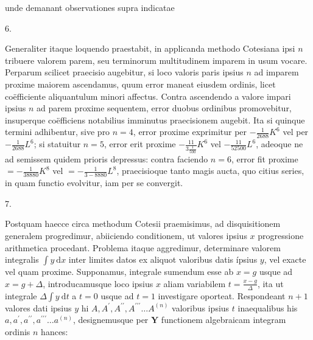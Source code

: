\documentclass[10pt]{article}
\begin{document}
unde demanant observationes supra indicatae

6.

Generaliter itaque loquendo praestabit, in applicanda methodo Cotesiana ipsi \(n\) tribuere valorem parem, seu terminorum multitudinem imparem in usum vocare. Perparum scilicet praecisio augebitur, si loco valoris paris ipsius \(n\) ad imparem proxime maiorem ascendamus, quum error maneat eiusdem ordinis, licet coëfficiente aliquantulum minori affectus. Contra ascendendo a valore impari ipsius \(n\) ad parem proxime sequentem, error duobus ordinibus promovebitur, insuperque coëfficiens notabilius imminutus praecisionem augebit. Ita si quinque termini adhibentur, sive pro \(n=4\), error proxime exprimitur per \(-\frac{1}{2688} K^{6}\) vel per \(-\frac{1}{2688} L^{6}\); si statuitur \(n=5\), error erit proxime \(-\frac{11}{3 \frac{1}{500}} K^{6}\) vel \(-\frac{11}{52500} L^{6}\), adeoque ne ad semissem quidem prioris depressus: contra faciendo \(n=6\), error fit proxime \(=-\frac{1}{38880} K^{8}\) vel \(=-\frac{1}{3-8880} L^{8}\), praecisioque tanto magis aucta, quo citius series, in quam functio evolvitur, iam per se convergit.

7.

Postquam haecce circa methodum Cotesii praemisimus, ad disquisitionem generalem progredimur, abiiciendo conditionem, ut valores ipsius \(x\) progressione arithmetica procedant. Problema itaque aggredimur, determinare valorem integralis \(\int y \mathrm{~d} x\) inter limites datos ex aliquot valoribus datis ípsius \(y\), vel exacte vel quam proxime. Supponamus, integrale sumendum esse ab \(x=g\) usque ad \(x=g+\Delta\), introducamusque loco ipsius \(x\) aliam variabilem \(t=\frac{x-g}{\Delta}\), ita ut integrale \(\Delta \int y \mathrm{~d} t\) a \(t=0\) usque ad \(t=1\) investigare oporteat. Respondeant \(n+1\) valores dati ipsius \(y\) hi \(A, A^{\prime}, A^{\prime \prime}, A^{\prime \prime \prime} \ldots A^{(n)}\) valoribus ipsius \(t\) inaequalibus his \(a, a^{\prime}, a^{\prime \prime}, a^{\prime \prime \prime} \ldots a^{(n)}\), designemusque per \(\boldsymbol{Y}\) functionem algebraicam integram ordinis \(n\) hances:
\end{document}
